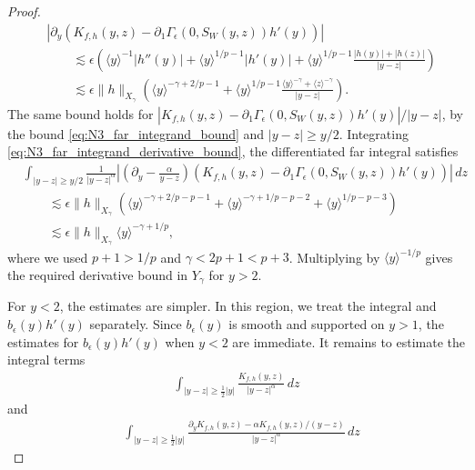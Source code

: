 \documentclass[11pt]{amsart}
\theoremstyle{definition}
\theoremstyle{remark}
\numberwithin{equation}{section}
\newcommand{\ang}[1]{\langle #1 \rangle}
\begin{document}
\begin{proof}
\begin{equation}\label{eq:N3_far_integrand_derivative_bound}
\begin{aligned}
    &\left|\partial_y\left(K_{f,h}(y,z)-\partial_1\Gamma_\epsilon(0,S_W(y,z))h'(y)\right)\right|\\
    &\qquad\lesssim\epsilon\left(
    \ang{y}^{-1}|h''(y)|+\ang{y}^{1/p-1}|h'(y)|
    +\ang{y}^{1/p-1}\frac{|h(y)|+|h(z)|}{|y-z|}\right)\\
    &\qquad\lesssim\epsilon\|h\|_{X_\gamma}\left(
    \ang{y}^{-\gamma+2/p-1}
    +\ang{y}^{1/p-1}\frac{\ang{y}^{-\gamma}+\ang{z}^{-\gamma}}{|y-z|}\right).
\end{aligned}
\end{equation}
The same bound holds for
$|K_{f,h}(y,z)-\partial_1\Gamma_\epsilon(0,S_W(y,z))h'(y)|/|y-z|$, by the
bound \eqref{eq:N3_far_integrand_bound} and $|y-z|\geq y/2$.
Integrating \eqref{eq:N3_far_integrand_derivative_bound}, the differentiated far integral satisfies
\begin{equation}\label{eq:N3_far_plus_derivative}
\begin{aligned}
    &\int_{|y-z|\geq y/2}\frac{1}{|y-z|^\alpha}
    \left|\left(\partial_y-\frac{\alpha}{y-z}\right)
    \left(K_{f,h}(y,z)-\partial_1\Gamma_\epsilon(0,S_W(y,z))h'(y)\right)\right|\,dz\\
    &\qquad\lesssim\epsilon\|h\|_{X_\gamma}\left(
    \ang{y}^{-\gamma+2/p-p-1}
    +\ang{y}^{-\gamma+1/p-p-2}
    +\ang{y}^{1/p-p-3}\right)\\
    &\qquad\lesssim\epsilon\|h\|_{X_\gamma}\ang{y}^{-\gamma+1/p},
\end{aligned}
\end{equation}
where we used $p+1>1/p$ and $\gamma<2p+1<p+3$.
Multiplying by $\ang{y}^{-1/p}$ gives the required derivative bound
in $Y_\gamma$ for $y>2$. \par
For $y < 2$, the estimates are simpler. In this region, we treat the integral and $b_\epsilon(y)h'(y)$ separately. Since $b_\epsilon(y)$ is smooth and supported on $y > 1$, the estimates for $b_\epsilon(y)h'(y)$ when $y < 2$ are immediate. It remains to estimate the integral terms 
\begin{align*}
    \int_{|y - z| \geq \frac{1}{2}|y|} \frac{K_{f,h}(y, z)}{|y - z|^\alpha} \, dz
\end{align*}
and 
\begin{align*}
    &\int_{|y-z|\geq \frac{1}{2}|y|}
    \frac{\partial_y K_{f,h}(y,z)-\alpha K_{f,h}(y,z)/(y-z)}{|y-z|^\alpha}\,dz
\end{align*}

\end{proof}
\end{document}
